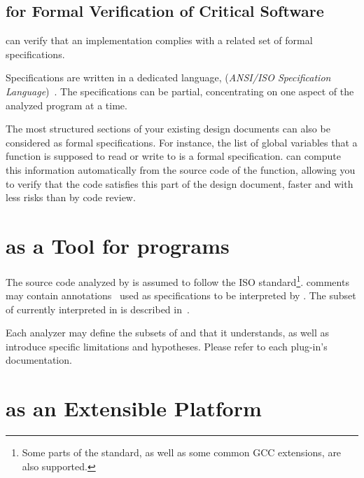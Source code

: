 \subsection{\FramaC for Formal Verification of Critical Software}

\FramaC can verify that an implementation complies with a related set of formal
specifications.

Specifications are written in a dedicated language, \acsl (\emph{ANSI/ISO \C
  Specification Language})~\cite{acsl}. The specifications can be partial,
concentrating on one aspect of the analyzed program at a time.

The most structured sections of your existing design documents can also be
considered as formal specifications. For instance, the list of global variables
that a function is supposed to read or write to is a formal
specification. \FramaC can compute this information automatically from the
source code of the function, allowing you to verify that the code satisfies
this part of the design document, faster and with less risks than by code
review.



\section{\FramaC as a Tool for \C programs}

The \C source code analyzed by \FramaC is assumed to follow the  ISO
standard\footnote{Some parts of
the  standard, as well as some common GCC extensions,
are also supported.}. \C comments may
contain \acsl annotations~\cite{acsl} used as specifications to be interpreted
by \FramaC. The subset of \acsl currently interpreted in \FramaC is described
in~\cite{acsl-implem}.

Each analyzer may define the subsets of \C and \acsl that it understands, as
well as introduce specific limitations and hypotheses. Please refer to each
plug-in's documentation.

\section{\FramaC as an Extensible Platform}

